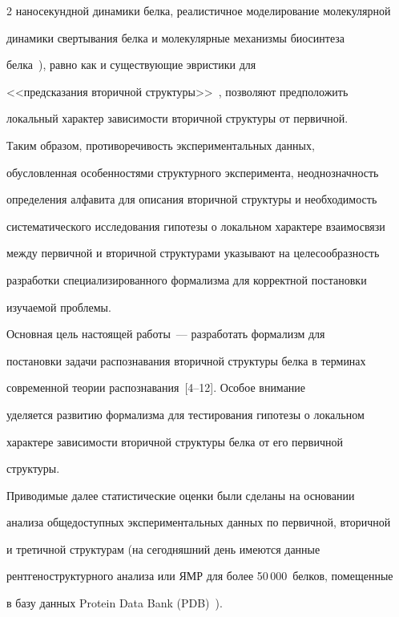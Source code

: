 \begin{multicols}{2}
наносекундной динамики белка, реалистичное моделирование молекулярной 

динамики свертывания белка и молекулярные механизмы биосинтеза 

     белка~\cite{1tor, 13tor, 14tor}), равно как  и существующие эвристики для 

<<предсказания вторичной структуры>>~\cite{3tor}, позволяют предположить 

локальный характер зависимости вторичной структуры от пер\-вичной.

     

     Таким образом, противоречивость экспериментальных данных, 

обусловленная особенностями структурного эксперимента, неоднозначность 

определения алфавита для описания вторичной структуры и необходимость 

систематического исследования гипотезы о локальном характере взаимосвязи 

между первичной и вторичной структурами указывают на целесообразность 

разработки специализированного формализма для корректной постановки 

изучаемой проб\-лемы. 

     

     Основная цель настоящей работы~--- разработать формализм для 

постановки задачи распознавания вторичной структуры белка в терминах 

современной теории распознавания~[4--12]. Особое внимание 

уделяется развитию формализма для тестирования гипотезы о локальном 

характере зависимости вторичной структуры белка от его первичной 

струк\-туры.

     

     Приводимые далее статистические оценки были сделаны на основании 

анализа общедоступных экспериментальных данных по первичной, вторичной 

и третичной структурам (на сегодняшний день имеются данные  

рентгеноструктурного анализа или ЯМР для более 50\,000~белков, помещенные 

в базу данных Protein Data Bank (PDB)~\cite{2tor}). 




\end{multicols}
